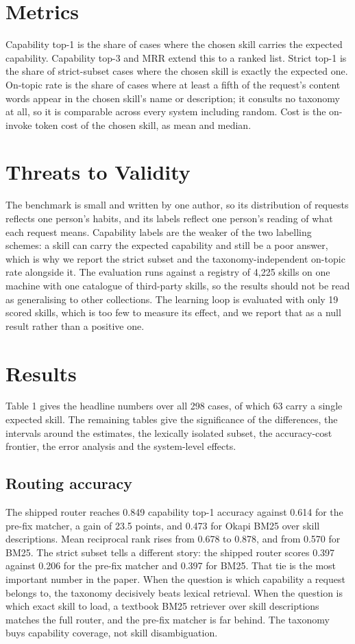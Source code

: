 \documentclass[sigconf,acmsmall]{acmart}
\begin{document}
\section{Metrics}
Capability top-1 is the share of cases where the chosen skill carries the expected capability. Capability top-3 and MRR extend this to a ranked list. Strict top-1 is the share of strict-subset cases where the chosen skill is exactly the expected one. On-topic rate is the share of cases where at least a fifth of the request's content words appear in the chosen skill's name or description; it consults no taxonomy at all, so it is comparable across every system including random. Cost is the on-invoke token cost of the chosen skill, as mean and median.

\section{Threats to Validity}
The benchmark is small and written by one author, so its distribution of requests reflects one person's habits, and its labels reflect one person's reading of what each request means. Capability labels are the weaker of the two labelling schemes: a skill can carry the expected capability and still be a poor answer, which is why we report the strict subset and the taxonomy-independent on-topic rate alongside it. The evaluation runs against a registry of 4,225 skills on one machine with one catalogue of third-party skills, so the results should not be read as generalising to other collections. The learning loop is evaluated with only 19 scored skills, which is too few to measure its effect, and we report that as a null result rather than a positive one.

\section{Results}
Table 1 gives the headline numbers over all 298 cases, of which 63 carry a single expected skill. The remaining tables give the significance of the differences, the intervals around the estimates, the lexically isolated subset, the accuracy-cost frontier, the error analysis and the system-level effects.

\subsection{Routing accuracy}
The shipped router reaches 0.849 capability top-1 accuracy against 0.614 for the pre-fix matcher, a gain of 23.5 points, and 0.473 for Okapi BM25 over skill descriptions. Mean reciprocal rank rises from 0.678 to 0.878, and from 0.570 for BM25. The strict subset tells a different story: the shipped router scores 0.397 against 0.206 for the pre-fix matcher and 0.397 for BM25.
That tie is the most important number in the paper. When the question is which capability a request belongs to, the taxonomy decisively beats lexical retrieval. When the question is which exact skill to load, a textbook BM25 retriever over skill descriptions matches the full router, and the pre-fix matcher is far behind. The taxonomy buys capability coverage, not skill disambiguation.
\end{document}
